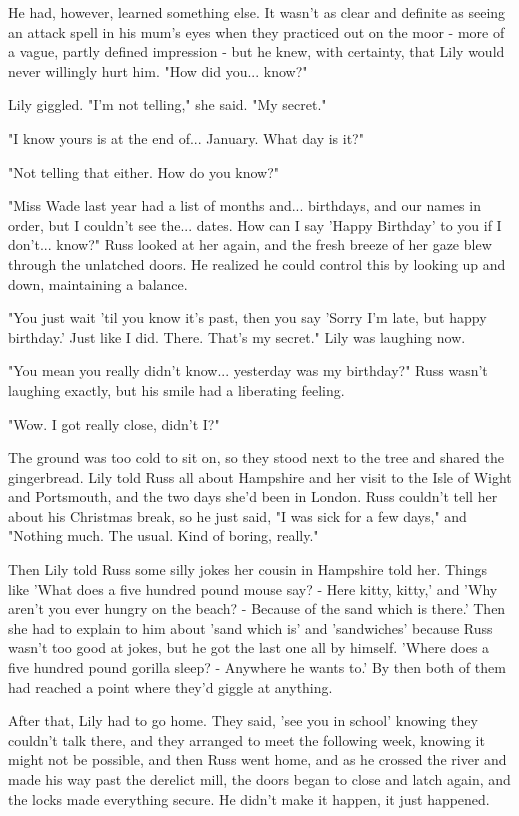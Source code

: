 \documentclass[a4paper,11pt]{article}
\begin{document}
He had, however, learned something else. It wasn't as clear and definite as seeing an attack spell in his mum's eyes when they practiced out on the moor - more of a vague, partly defined impression - but he knew, with certainty, that Lily would never willingly hurt him. "How did you... know?"

Lily giggled. "I'm not telling," she said. "My secret."

"I know yours is at the end of... January. What day is it?"

"Not telling that either. How do you know?"

"Miss Wade last year had a list of months and... birthdays, and our names in order, but I couldn't see the... dates. How can I say 'Happy Birthday' to you if I don't... know?" Russ looked at her again, and the fresh breeze of her gaze blew through the unlatched doors. He realized he could control this by looking up and down, maintaining a balance.

"You just wait 'til you know it's past, then you say 'Sorry I'm late, but happy birthday.' Just like I did. There. That's my secret." Lily was laughing now.

"You mean you really didn't know... yesterday was my birthday?" Russ wasn't laughing exactly, but his smile had a liberating feeling.

"Wow. I got really close, didn't I?"

The ground was too cold to sit on, so they stood next to the tree and shared the gingerbread. Lily told Russ all about Hampshire and her visit to the Isle of Wight and Portsmouth, and the two days she'd been in London. Russ couldn't tell her about his Christmas break, so he just said, "I was sick for a few days," and "Nothing much. The usual. Kind of boring, really."

Then Lily told Russ some silly jokes her cousin in Hampshire told her. Things like 'What does a five hundred pound mouse say? - Here kitty, kitty,' and 'Why aren't you ever hungry on the beach? - Because of the sand which is there.' Then she had to explain to him about 'sand which is' and 'sandwiches' because Russ wasn't too good at jokes, but he got the last one all by himself. 'Where does a five hundred pound gorilla sleep? - Anywhere he wants to.' By then both of them had reached a point where they'd giggle at anything.

After that, Lily had to go home. They said, 'see you in school' knowing they couldn't talk there, and they arranged to meet the following week, knowing it might not be possible, and then Russ went home, and as he crossed the river and made his way past the derelict mill, the doors began to close and latch again, and the locks made everything secure. He didn't make it happen, it just happened.
\end{document}
